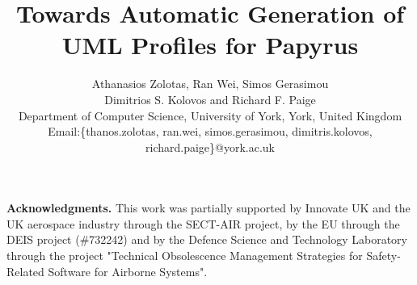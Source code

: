 \documentclass[global]{svjour}
\begin{document}
\title{Towards Automatic Generation of \\ UML Profiles for Papyrus}

\author{Athanasios Zolotas,  Ran Wei, Simos Gerasimou \\ Dimitrios S. Kolovos and Richard F. Paige \\
	Department of Computer Science, University of York, York, United Kingdom\\
		Email:\{thanos.zolotas, ran.wei, simos.gerasimou, dimitris.kolovos, richard.paige\}@york.ac.uk
	}

\maketitle{}










\noindent\textbf{Acknowledgments.}
This work was partially supported by Innovate UK and the UK aerospace industry 
through the SECT-AIR project, by the EU through the DEIS project (\#732242) and 
by the Defence Science and Technology Laboratory through the project "Technical 
Obsolescence Management Strategies for Safety-Related Software for Airborne 
Systems".

\clearpage


\end{document}
